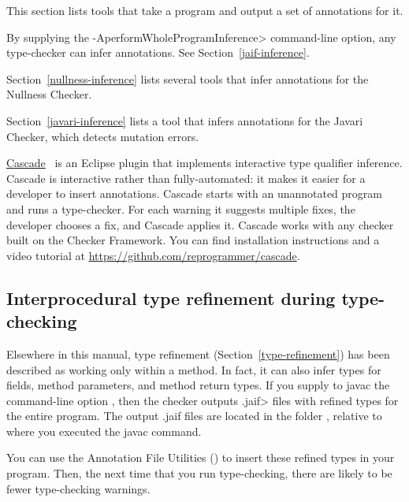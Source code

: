 This section lists tools that take a program and output a set of
annotations for it.

By supplying the \<-AperformWholeProgramInference> command-line option,
any type-checker can infer annotations. See Section~\ref{jaif-inference}.

Section~\ref{nullness-inference} lists several tools that infer
annotations for the Nullness Checker.

Section~\ref{javari-inference} lists a tool that infers
annotations for the Javari Checker, which detects mutation errors.

\href{https://github.com/reprogrammer/cascade/}{Cascade}~\cite{VakilianPEJ2014}
is an Eclipse plugin that implements interactive type qualifier inference.
Cascade is interactive rather than fully-automated:  it makes it easier for
a developer to insert annotations.
Cascade starts with an unannotated program and runs a type-checker.  For each
warning it suggests multiple fixes, the developer chooses a fix, and
Cascade applies it.  Cascade works with any checker built on the Checker
Framework.
You can find installation instructions and a video tutorial at \url{https://github.com/reprogrammer/cascade}.


\subsection{Interprocedural type refinement during type-checking\label{jaif-inference}}

Elsewhere in this manual, type refinement (Section~\ref{type-refinement})
has been described as working only within a method.  In fact, it can also
infer types for fields, method parameters, and method return types.  If you
supply to javac the command-line option , then the
checker outputs \<.jaif> files with refined types for the entire program.
The output .jaif files are located in the folder ,
relative to where you executed the javac command.

You can use the Annotation File Utilities
() to
insert these refined types in your program.  Then, the next time that you
run type-checking, there are likely to be fewer type-checking warnings.

